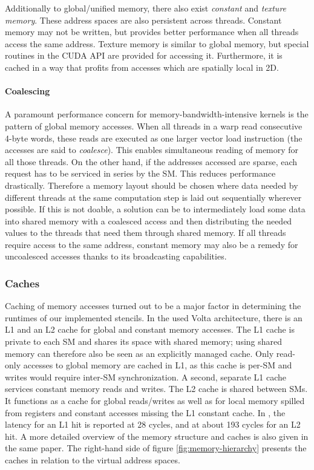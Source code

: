 Additionally to global/unified memory, there also exist \emph{constant} and \emph{texture memory}. These address spaces are also persistent across threads. Constant memory may not be written, but provides better performance when all threads access the same address. Texture memory is similar to global memory, but special routines in the CUDA API are provided for accessing it. Furthermore, it is cached in a way that profits from accesses which are spatially local in 2D.

\paragraph{Coalescing} A paramount performance concern for memory-bandwidth-intensive kernels is the pattern of global memory accesses. When all threads in a warp read consecutive 4-byte words, these reads are executed as one larger vector load instruction (the accesses are said to \emph{coalesce}). This enables simultaneous reading of memory for all those threads. On the other hand, if the addresses accessed are sparse, each request has to be serviced in series by the SM. This reduces performance drastically. Therefore a memory layout should be chosen where data needed by different threads at the same computation step is laid out sequentially wherever possible. If this is not doable, a solution can be to intermediately load some data into shared memory with a coalesced access and then distributing the needed values to the threads that need them through shared memory. If all threads require access to the same address, constant memory may also be a remedy for uncoalesced accesses thanks to its broadcasting capabilities.

\subsubsection{Caches} Caching of memory accesses turned out to be a major factor in determining the runtimes of our implemented stencils. In the used Volta architecture, there is an L1 and an L2 cache for global and constant memory accesses. The L1 cache is private to each SM and shares its space with shared memory; using shared memory can therefore also be seen as an explicitly managed cache. Only read-only accesses to global memory are cached in L1, as this cache is per-SM and writes would require inter-SM synchronization. A second, separate L1 cache services constant memory reads and writes. The L2 cache is shared between SMs. It functions as a cache for global reads/writes as well as for local memory spilled from registers and constant accesses missing the L1 constant cache. In \cite[Chapter 3]{dissecting}, the latency for an L1 hit is reported at 28 cycles, and at about 193 cycles for an L2 hit. A more detailed overview of the memory structure and caches is also given in the same paper. The right-hand side of figure \ref{fig:memory-hierarchy} presents the caches in relation to the virtual address spaces.

